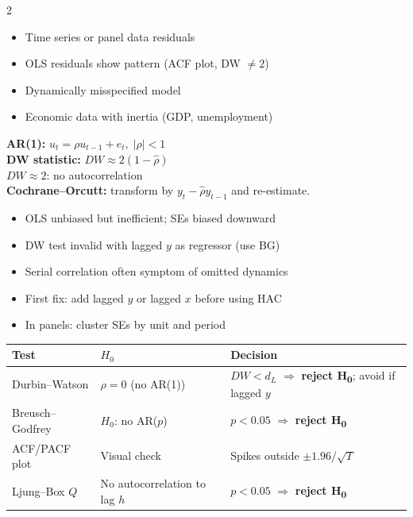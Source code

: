 \documentclass[10pt,a4paper]{article}
\newcommand{\reject}{$\Rightarrow$ \textbf{reject H\textsubscript{0}}}
\begin{document}
\begin{multicols}{2}

\begin{tcolorbox}[when]
\begin{itemize}
  \item Time series or panel data residuals
  \item OLS residuals show pattern (ACF plot, DW $\neq 2$)
  \item Dynamically misspecified model
  \item Economic data with inertia (GDP, unemployment)
\end{itemize}
\end{tcolorbox}

\begin{tcolorbox}[key]
\textbf{AR(1):} $u_t = \rho u_{t-1} + e_t,\; |\rho| < 1$\\[4pt]
\textbf{DW statistic:} $DW \approx 2(1-\hat\rho)$\\
$DW \approx 2$: no autocorrelation\\[4pt]
\textbf{Cochrane--Orcutt:} transform by $y_t - \hat\rho y_{t-1}$ and re-estimate.
\end{tcolorbox}

\columnbreak

\begin{tcolorbox}[watchout]
\begin{itemize}
  \item OLS unbiased but inefficient; SEs biased downward
  \item DW test invalid with lagged $y$ as regressor (use BG)
  \item Serial correlation often symptom of omitted dynamics
  \item First fix: add lagged $y$ or lagged $x$ before using HAC
  \item In panels: cluster SEs by unit and period
\end{itemize}
\end{tcolorbox}

\end{multicols}

\begin{tcolorbox}[tests]
\begin{tabularx}{\linewidth}{lXl}
\toprule
\textbf{Test} & \textbf{$H_0$} & \textbf{Decision} \\
\midrule
Durbin--Watson & $\rho = 0$ (no AR(1)) & $DW < d_L$ \reject; avoid if lagged $y$ \\
\rowcolor{RowGray}
Breusch--Godfrey & $H_0$: no AR($p$) & $p < 0.05$ \reject \\
ACF/PACF plot & Visual check & Spikes outside $\pm 1.96/\sqrt{T}$ \\
\rowcolor{RowGray}
Ljung--Box $Q$ & No autocorrelation to lag $h$ & $p < 0.05$ \reject \\
\bottomrule
\end{tabularx}
\end{tcolorbox}
\end{document}
